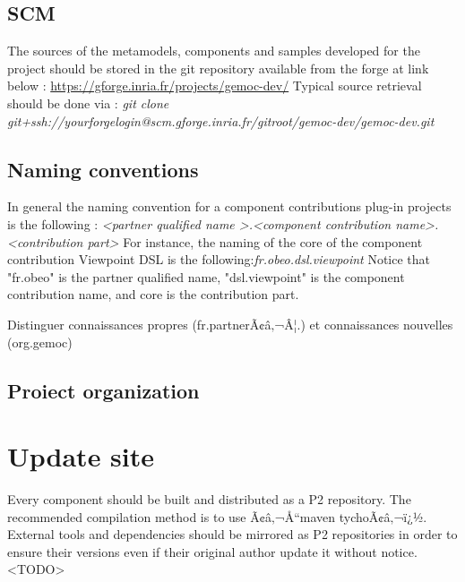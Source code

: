 \documentclass{gemoc} %
\begin{document}
\subsection{SCM}
The sources of the metamodels, components and samples developed for the project should be stored in the git repository available from the forge at link below :\newline
\url{https://gforge.inria.fr/projects/gemoc-dev/}
\newline\newline
Typical source retrieval should be done via :\newline
\textit{git clone git+ssh://yourforgelogin@scm.gforge.inria.fr/gitroot/gemoc-dev/gemoc-dev.git}
\subsection{Naming conventions}
In general the naming convention for a component contributions plug-in projects is the following :
\newline
\textit{\textless partner qualified name \textgreater.\textless component contribution name\textgreater .\textless contribution part\textgreater }
\newline\newline
For instance, the naming of the core of the component contribution Viewpoint DSL is the following:\textit{fr.obeo.dsl.viewpoint}
\newline
Notice that "fr.obeo" is the partner qualified name, "dsl.viewpoint" is the component contribution name, and core is the contribution part.
\newline

Distinguer connaissances propres (fr.partnerÃ¢â‚¬Â¦.) et connaissances nouvelles (org.gemoc)
\subsection{Proiect organization}
\section{Update site}
Every component should be built and distributed as a P2 repository. The recommended compilation method is to use Ã¢â‚¬Å“maven tychoÃ¢â‚¬ï¿½.
\newline
External tools and dependencies should be mirrored as P2 repositories in order to ensure their versions even if their original author update it without notice.
\newline
\textless TODO\textgreater
\end{document}
